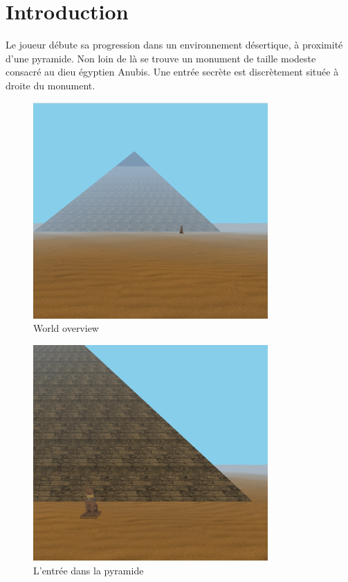 \documentclass[12pt,oneside,letterpaper]{article}
\title{} %
\begin{document}


\newpage
\doublespacing
\renewcommand{\baselinestretch}{1}\normalsize
\tableofcontents
\renewcommand{\baselinestretch}{1}\normalsize
\thispagestyle{fancy} %

\newpage
{} 

\section{Introduction}
Le joueur débute sa progression dans un environnement désertique, à proximité d'une pyramide. Non loin de là se trouve un monument de taille modeste consacré au dieu égyptien Anubis. Une entrée secrète est discrètement située à droite du monument.

\begin{figure}[H]
    \centering
    \includegraphics[width=0.8\textwidth]{figures/pyrdamid-big.png}
    \caption{World overview}
\end{figure}

\begin{figure}[H]
    \centering
    \includegraphics[width=0.8\textwidth]{figures/pyramid-close.png}
    \caption{L'entrée dans la pyramide}
\end{figure}
\end{document}
